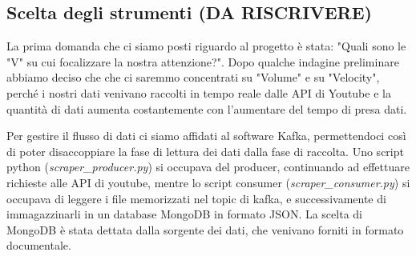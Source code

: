 \subsection*{Scelta degli strumenti (DA RISCRIVERE)}
La prima domanda che ci siamo posti riguardo al progetto è stata: "Quali sono le "V" su cui focalizzare la nostra attenzione?".
Dopo qualche indagine preliminare abbiamo deciso che che ci saremmo concentrati su "Volume" e su "Velocity", perché i nostri dati venivano raccolti in tempo reale dalle API di Youtube e la quantità di dati aumenta costantemente con l'aumentare del tempo di presa dati.

Per gestire il flusso di dati ci siamo affidati al software Kafka, permettendoci così di poter disaccoppiare la fase di lettura dei dati dalla fase di  raccolta. Uno script python (\textit{scraper\_producer.py}) si occupava del producer, continuando ad effettuare richieste alle API di youtube, mentre lo script consumer (\textit{scraper\_consumer.py}) si occupava di leggere i file memorizzati nel topic di kafka, e successivamente di immagazzinarli in un database MongoDB in formato JSON. La scelta di MongoDB è stata dettata dalla sorgente dei dati, che venivano forniti in formato documentale.